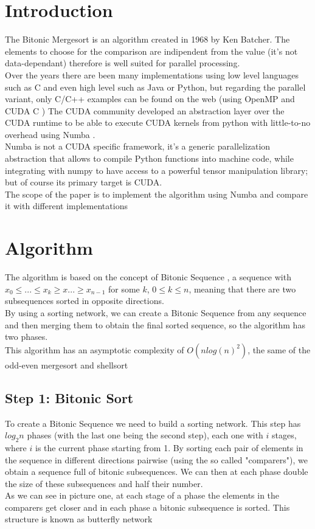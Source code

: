 \documentclass[a4paper, 12pt, oneside]{article}
\begin{document}
\section{Introduction}
The Bitonic Mergesort \cite{bitonic} is an algorithm created in 1968 by Ken Batcher\cite{ken}. The elements to choose for the comparison are indipendent from the value (it's not data-dependant) therefore is well suited for parallel processing.\\
Over the years there are been many implementations using low level languages such as C and even high level such as Java or Python, but regarding the parallel variant, only C/C++ examples can be found on the web (using OpenMP \cite{openmp} and CUDA C \cite{cudac})
The CUDA community developed an abstraction layer over the CUDA runtime to be able to execute CUDA kernels from python with little-to-no overhead using Numba \cite{numba}.\\
Numba is not a CUDA specific framework, it's a generic parallelization abstraction that allows to compile Python functions into machine code, while integrating with numpy \cite{numpy} to have access to a powerful tensor manipulation library;
but of course its primary target is CUDA.\\
The scope of the paper is to implement the algorithm using Numba and compare it with different implementations

\section{Algorithm}

The algorithm is based on the concept of Bitonic Sequence \cite{bitonic}, a sequence with $x_0 \leq ... \leq x_k \geq x ... \geq x_{n-1}$ for some $k$, $0 \leq k \le n$, meaning that there are two subsequences sorted in opposite directions.\\
By using a sorting network, we can create a Bitonic Sequence from any sequence and then merging them to obtain the final sorted sequence, so the algorithm has two phases.\\
This algorithm has an asymptotic complexity of $O(nlog(n)^2)$, the same of the odd-even mergesort and shellsort \cite{sorting}

\subsection{Step 1: Bitonic Sort}
To create a Bitonic Sequence we need to build a sorting network. This step has $log_2 n$ phases (with the last one being the second step), each one with $i$ stages, where $i$ is the current phase starting from 1.
By sorting each pair of elements in the sequence in different directions pairwise (using the so called "comparers"), we obtain a sequence full of bitonic subsequences. We can then at each phase double the size of these subsequences and half their number.\\
As we can see in picture one, at each stage of a phase the elements in the comparers get closer and in each phase a bitonic subsequence is sorted. This structure is known as butterfly network \cite{butterfly}
\end{document}
